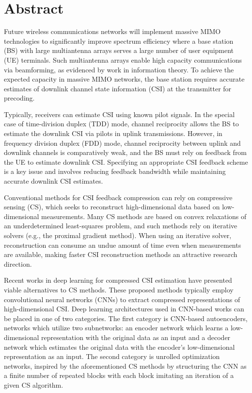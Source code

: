 \newpage
\chapter*{\centering Abstract}

Future wireless communications networks will implement massive MIMO technologies to significantly improve spectrum efficiency where a base station (BS) with large multiantenna arrays serves a large number of user equipment (UE) terminals. Such multiantenna arrays enable high capacity communications via beamforming, as evidenced by work in information theory. To achieve the expected capacity in massive MIMO networks, the base station requires accurate estimates of downlink channel state information (CSI) at the transmitter for precoding.

Typically, receivers can estimate CSI using known pilot signals. In the special case of time-division duplex (TDD) mode, channel reciprocity allows the BS to estimate the downlink CSI via pilots in uplink transmissions. However, in frequency division duplex (FDD) mode, channel reciprocity between uplink and downlink channels is comparatively weak, and the BS must rely on feedback from the UE to estimate downlink CSI. Specifying an appropriate CSI feedback scheme is a key issue and involves reducing feedback bandwidth while maintaining accurate downlink CSI estimates.

Conventional methods for CSI feedback compression can rely on compressive sensing (CS), which seeks to reconstruct high-dimensional data based on low-dimensional measurements. Many CS methods are based on convex relaxations of an underdetermined least-squares problem, and such methods rely on iterative solvers (e.g., the proximal gradient method). When using an iterative solver, reconstruction can consume an undue amount of time even when measurements are available, making faster CSI reconstruction methods an attractive research direction.

Recent works in deep learning for compressed CSI estimation have presented viable alternatives to CS methods. These proposed methods typically employ convolutional neural networks (CNNs) to extract compressed representations of high-dimensional CSI. Deep learning architectures used in CNN-based works can be placed in one of two categories. The first category is CNN-based autoencoders, networks which utilize two subnetworks: an encoder network which learns a low-dimensional representation with the original data as an input and a decoder network which estimates the original data with the encoder's low-dimensional representation as an input. The second category is unrolled optimization networks, inspired by the aforementioned CS methods by structuring the CNN as a finite number of repeated blocks with each block imitating an iteration of a given CS algorithm.

